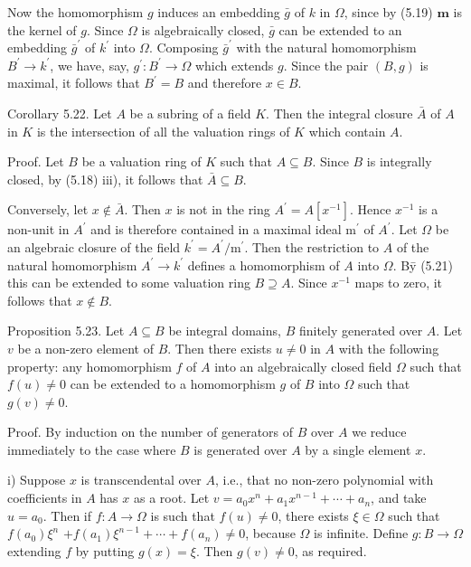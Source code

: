 \documentclass{standalone}
\theoremstyle{definition}
\theoremstyle{remark}
\begin{document}
Now the homomorphism $g$ induces an embedding $\bar{g}$ of $k$ in $\Omega$, since by (5.19) $\boldsymbol{m}$ is the kernel of $g$. Since $\Omega$ is algebraically closed, $\bar{g}$ can be extended to an embedding $\bar{g}^{\prime}$ of $k^{\prime}$ into $\Omega$. Composing $\bar{g}^{\prime}$ with the natural homomorphism $B^{\prime} \rightarrow k^{\prime}$, we have, say, $g^{\prime}: B^{\prime} \rightarrow \Omega$ which extends $g$. Since the pair $(B, g)$ is maximal, it follows that $B^{\prime}=B$ and therefore $x \in B$.

Corollary 5.22. Let $A$ be a subring of a field $K$. Then the integral closure $\bar{A}$ of $A$ in $K$ is the intersection of all the valuation rings of $K$ which contain $A$.

Proof. Let $B$ be a valuation ring of $K$ such that $A \subseteq B$. Since $B$ is integrally closed, by (5.18) iii), it follows that $\bar{A} \subseteq B$.

Conversely, let $x \notin \bar{A}$. Then $x$ is not in the ring $A^{\prime}=A\left[x^{-1}\right]$. Hence $x^{-1}$ is a non-unit in $A^{\prime}$ and is therefore contained in a maximal ideal $\mathrm{m}^{\prime}$ of $A^{\prime}$. Let $\Omega$ be an algebraic closure of the field $k^{\prime}=A^{\prime} / \mathrm{m}^{\prime}$. Then the restriction to $A$ of the natural homomorphism $A^{\prime} \rightarrow k^{\prime}$ defines a homomorphism of $A$ into $\Omega$. Bȳ (5.21) this can be extended to some valuation ring $B \supseteq A$. Since $x^{-1}$ maps to zero, it follows that $x \notin B$.

Proposition 5.23. Let $A \subseteq B$ be integral domains, $B$ finitely generated over $A$. Let $v$ be a non-zero element of $B$. Then there exists $u \neq 0$ in $A$ with the following property: any homomorphism $f$ of $A$ into an algebraically closed field $\Omega$ such that $f(u) \neq 0$ can be extended to a homomorphism $g$ of $B$ into $\Omega$ such that $g(v) \neq 0$.

Proof. By induction on the number of generators of $B$ over $A$ we reduce immediately to the case where $B$ is generated over $A$ by a single element $x$.

i) Suppose $x$ is transcendental over $A$, i.e., that no non-zero polynomial with coefficients in $A$ has $x$ as a root. Let $v=a_{0} x^{n}+a_{1} x^{n-1}+\cdots+a_{n}$, and take $u=a_{0}$. Then if $f: A \rightarrow \Omega$ is such that $f(u) \neq 0$, there exists $\xi \in \Omega$ such that $f\left(a_{0}\right) \xi^{n}$ $+f\left(a_{1}\right) \xi^{n-1}+\cdots+f\left(a_{n}\right) \neq 0$, because $\Omega$ is infinite. Define $g: B \rightarrow \Omega$ extending $f$ by putting $g(x)=\xi$. Then $g(v) \neq 0$, as required.
\end{document}
